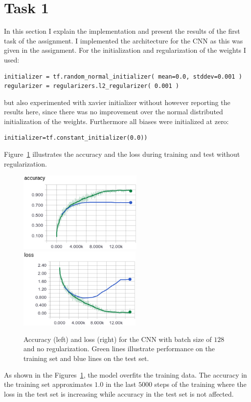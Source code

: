 \documentclass{article}
\begin{document}
\section{Task 1}
In this section I explain the implementation and present the results of the first task of the assignment.
I implemented the architecture for the CNN as this was given in the assignment.
For the initialization and regularization of the weights I used:
\begin{verbatim}
initializer = tf.random_normal_initializer( mean=0.0, stddev=0.001 )
regularizer = regularizers.l2_regularizer( 0.001 )
\end{verbatim}
but also experimented with xavier initializer without however reporting the results here, since there was no improvement over the normal distributed initialization of the weights.
Furthermore all biases were initialized at zero:
\begin{verbatim}
initializer=tf.constant_initializer(0.0))
\end{verbatim}
Figure~\ref{fig:1} illustrates the accuracy and the loss during training and test without regularization.
\begin{figure}[h!]
\centering
\includegraphics[height=4.0cm]{acc-plain.png}\
\includegraphics[height=4.0cm]{loss-plain.png}
\caption{Accuracy (left) and loss (right) for the CNN with batch size of $128$ and no regularization. Green lines illustrate performance on the training set and blue lines on the test set.}
\label{fig:1}
\end{figure}
As shown in the Figures~\ref{fig:1}, the model overfits the training data.
The accuracy in the training set approximates $1.0$ in the last $5000$ steps of the training where the loss in the test set is increasing while accuracy in the test set is not affected.
\end{document}
